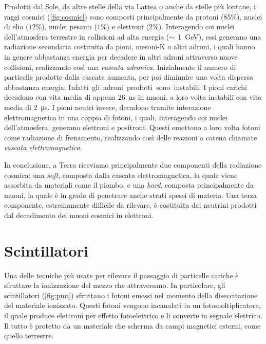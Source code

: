 \documentclass[../main.tex]{subfiles}
\begin{document}
Prodotti dal Sole, da altre stelle della via Lattea o anche da stelle più lontane, i raggi cosmici (\autoref{fig:cosmic}) sono composti principalmente da protoni ($85\%$), nuclei di elio ($12\%$), nuclei pesanti ($1\%$) e elettroni ($2\%$). Interagendo coi nuclei dell'atmosfera terrestre in collisioni ad alta energia ($\small \sim$ \SI{1}{\GeV}), essi generano una radiazione secondaria costituita da pioni, mesoni-K o altri adroni, i quali hanno in genere abbastanza energia per decadere in altri adroni attraverso nuove collisioni, realizzando così una \emph{cascata adronica}. Inizialmente il numero di particelle prodotte dalla cascata aumenta, per poi diminuire una volta dispersa abbastanza energia. \mbox{Infatti gli adroni prodotti sono instabili.} I pioni carichi decadono con vita media di appena \SI{26}{\ns} in muoni, a loro volta instabili con vita media di \SI{2}{\micro\s}. I pioni neutri invece, decadono tramite interazione elettromagnetica in una coppia di fotoni, i quali, interagendo coi nuclei dell'atmosfera, generano elettroni e positroni. Questi emettono a loro volta fotoni come radiazione di frenamento, realizzando così delle reazioni a catena chiamate \emph{cascata elettromagnetica}.


In conclusione, a Terra riceviamo principalmente due componenti della radiazione cosmica: una \emph{soft}, composta dalla cascata elettromagnetica, la quale viene assorbita da materiali come il piombo, e una \emph{hard}, composta principalmente da muoni, la quale è in grado di penetrare anche strati spessi di materia. 
Una terza componente, estremamente difficile da rilevare, è costituita dai neutrini prodotti dal decadimento dei muoni cosmici in elettroni.

\section{Scintillatori}
Una delle tecniche più usate per rilevare il passaggio di particelle cariche è sfruttare la ionizzazione del mezzo che attraversano. In particolare, gli scintillatori (\autoref{fig:pmt}) sfruttano i fotoni emessi nel momento della diseccitazione del materiale ionizzato. Questi fotoni vengono incanalati in un fotomoltiplicatore, il quale produce elettroni per effetto fotoelettrico e li converte in segnale elettrico. Il tutto è protetto da un materiale che scherma da campi magnetici esterni, come quello terrestre.
\end{document}
